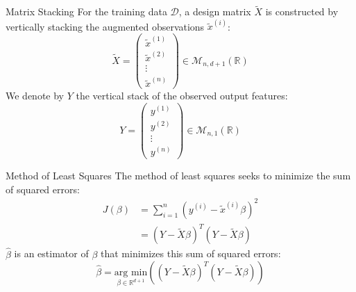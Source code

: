 \begin{frame}{Matrix Stacking}
	For the training data $\mathcal{D}$, a design matrix $\tilde{X}$ is constructed by vertically stacking the augmented observations $\tilde{x}^{(i)}$:
	\begin{equation}
		\tilde{X} = \begin{pmatrix}\tilde{x}^{(1)} \\ \tilde{x}^{(2)} \\ \vdots \\ \tilde{x}^{(n)} \end{pmatrix} \in \mathcal{M}_{n, d+1}(\mathbb{R})
		\nonumber
	\end{equation}
	We denote by $Y$ the vertical stack of the observed output features:
	\begin{equation}
		Y = \begin{pmatrix}y^{(1)} \\ y^{(2)} \\ \vdots \\ y^{(n)} \end{pmatrix} \in \mathcal{M}_{n, 1}(\mathbb{R})
		\nonumber
	\end{equation}	
\end{frame}

\begin{frame}{Method of Least Squares}
	The method of least squares seeks to minimize the sum of squared errors:
	\begin{equation}
		\begin{aligned}
			J(\beta) &= \sum_{i=1}^n \left(y^{(i)} - \tilde{x}^{(i)} \beta\right)^2 \\
			&= \left(Y - \tilde{X} \beta\right)^T \left(Y - \tilde{X} \beta\right)
		\end{aligned}
		\nonumber
	\end{equation}
	$\hat{\beta}$ is an estimator of $\beta$ that minimizes this sum of squared errors:
	\begin{equation}
		\hat{\beta} = \underset{\beta \in \mathbb{R}^{d+1}}{\text{arg min}}\left(\left(Y - \tilde{X} \beta\right)^T \left(Y - \tilde{X} \beta\right)\right)
		\nonumber
	\end{equation}
\end{frame}

